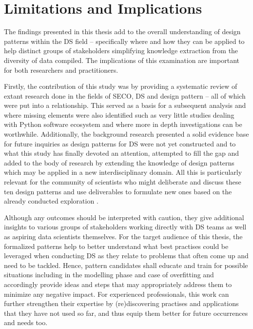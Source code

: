 \section{Limitations and Implications}
\label{ImplicationsLimitations}
The findings presented in this thesis add to the overall understanding of design patterns within the \ac{DS} field -- specifically where and how they can be applied to help distinct groups of stakeholders simplifying knowledge extraction from the diversity of data compiled.
The implications of this examination are important for both researchers and practitioners.

Firstly, the contribution of this study was by providing a systematic review of extant research done in the fields of \ac{SECO}, \ac{DS} and design pattern -- all of which were put into a relationship. 
This served as a basis for a subsequent analysis and where missing elements were also identified such as very little studies dealing with Python software ecosystem and where more in depth investigations can be worthwhile. 
Additionally, the background research presented a solid evidence base for future inquiries as design patterns for \ac{DS} were not yet constructed and to what this study has finally devoted an attention, attempted to fill the gap and added to the body of research by extending the knowledge of design patterns which may be applied in a new interdisciplinary domain.
All this is particularly relevant for the community of scientists who might deliberate and discuss these ten design patterns and use deliverables to formulate new ones based on the already conducted exploration \parencite{Stol:2010:CUO:1833272.1833276}.

Although any outcomes should be interpreted with caution, they give additional insights to various groups of stakeholders working directly with \ac{DS} teams as well as aspiring data scientists themselves. 
For the target audience of this thesis, the formalized patterns help to better understand what best practises could be leveraged when conducting \ac{DS} as they relate to problems that often come up and need to be tackled. 
Hence, pattern candidates shall educate and train for possible situations including in the modelling phase and case of overfitting and accordingly provide ideas and steps that may appropriately address them to minimize any negative impact. 
For experienced professionals, this work can further strengthen their expertise by (re)discovering practises and applications that they have not used so far, and thus equip them better for future occurrences and needs too.

